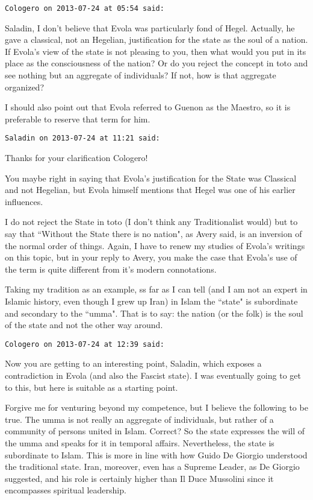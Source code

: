 \begin{footnotesize}
\begin{sffamily}
\hfill

\texttt{Cologero on 2013-07-24 at 05:54 said: }

Saladin, I don't believe that Evola was particularly fond of Hegel. Actually, he gave a classical, not an Hegelian, justification for the state as the soul of a nation. If Evola's view of the state is not pleasing to you, then what would you put in its place as the consciousness of the nation? Or do you reject the concept in toto and see nothing but an aggregate of individuals? If not, how is that aggregate organized?

I should also point out that Evola referred to Guenon as the Maestro, so it is preferable to reserve that term for him.


\hfill

\texttt{Saladin on 2013-07-24 at 11:21 said: }

Thanks for your clarification Cologero!

You maybe right in saying that Evola's justification for the State was Classical and not Hegelian, but Evola himself mentions that Hegel was one of his earlier influences.

I do not reject the State in toto (I don't think any Traditionalist would) but to say that ``Without the State there is no nation", as Avery said, is an inversion of the normal order of things. Again, I have to renew my studies of Evola's writings on this topic, but in your reply to Avery, you make the case that Evola's use of the term is quite different from it's modern connotations.

Taking my tradition as an example, ss far as I can tell (and I am not an expert in Islamic history, even though I grew up Iran) in Islam the ``state" is subordinate and secondary to the ``umma". That is to say: the nation (or the folk) is the soul of the state and not the other way around.


\hfill

\texttt{Cologero on 2013-07-24 at 12:39 said: }

Now you are getting to an interesting point, Saladin, which exposes a contradiction in Evola (and also the Fascist state). I was eventually going to get to this, but here is suitable as a starting point.

Forgive me for venturing beyond my competence, but I believe the following to be true. The umma is not really an aggregate of individuals, but rather of a community of persons united in Islam. Correct? So the state expresses the will of the umma and speaks for it in temporal affairs. Nevertheless, the state is subordinate to Islam. This is more in line with how Guido De Giorgio understood the traditional state. Iran, moreover, even has a Supreme Leader, as De Giorgio suggested, and his role is certainly higher than Il Duce Mussolini since it encompasses spiritual leadership.


\end{sffamily}
\end{footnotesize}
